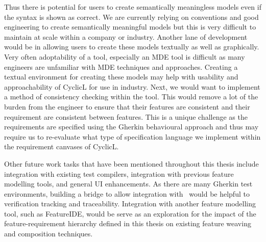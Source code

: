 Thus there is potential for users to create semantically meaningless models even if the syntax is shown as correct. We are currently relying on conventions and good engineering to create semantically meaningful models but this is very difficult to maintain at scale within a company or industry. Another lane of development would be in allowing users to create these models textually as well as graphically. Very often adoptability of a tool, especially an \ac{MDE} tool is difficult as many engineers are unfamiliar with \ac{MDE} techniques and approaches. Creating a textual environment for creating these models may help with usability and approachability of CyclicL for use in industry. Next, we would want to implement a method of consistency checking within the tool. This would remove a lot of the burden from the engineer to ensure that their features are consistent and their requirement are consistent between features. This is a unique challenge as the requirements are specified using the Gherkin behavioural approach and thus may require us to re-evaluate what type of specification language we implement within the requirement canvases of CyclicL.

Other future work tasks that have been mentioned throughout this thesis include integration with existing test compilers, integration with previous feature modelling tools, and general UI enhancements. As there are many Gherkin test environments, building a bridge to allow integration with \tool\ would be helpful to verification tracking and traceability. Integration with another feature modelling tool, such as FeatureIDE, would be serve as an exploration for the impact of the feature-requirement hierarchy defined in this thesis on existing feature weaving and composition techniques.


